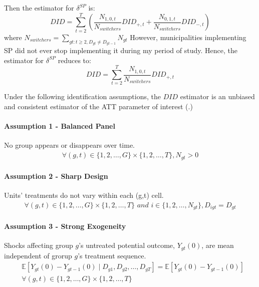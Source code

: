\documentclass[10pt, oneside]{book}
\begin{document}
Then the estimator for $\delta^{SP}$ is:
\begin{equation*}
    DID = \sum_{t = 2}^T \left(\frac{N_{1,0,t}}{N_{switchers}} DID_{+,t} + \frac{N_{0,1,t}}{N_{switchers}} DID_{-,t}\right)
\end{equation*}
where $N_{switchers} = \sum_{gt: t\geq2, D_{gt}\neq D_{gt-1}} N_{gt}$
However, municipalities implementing SP did not ever stop implementing it during my period of study. Hence, the estimator for $\delta^{SP}$ reduces to:
\begin{equation*}
    DID = \sum_{t = 2}^T  \frac{N_{1,0,t}}{N_{switchers}} DID_{+,t}
\end{equation*}

Under the following identification assumptions, the $DID$ estimator is an unbiased and consistent estimator of the ATT parameter of interest (\cite{deChaisemartin_twfe_weight}.)

\paragraph{Assumption 1 - Balanced Panel} No group appears or disappears over time. \begin{align*}
\forall (g,t) \in \{1, 2, \dots, G\} \times \{1, 2, \dots, T\}, N_{gt} > 0
\end{align*}

\paragraph{Assumption 2 - Sharp Design} Units' treatments do not vary within each (g,t) cell.
\begin{align*}
\forall (g,t) \in \{1, 2, \dots, G\} \times \{1, 2, \dots, T\} \textit{ and } i \in \{1, 2, \dots, N_{gt}\}, D_{igt} = D_{gt}
\end{align*}

\paragraph{Assumption 3 - Strong Exogeneity} Shocks affecting group $g$'s untreated potential outcome, $Y_{gt}(0)$, are mean independent of grorup $g$'s treatment sequence. 
\begin{align*}
& \mathbb{E}[Y_{gt}(0) - Y_{gt-1}(0) \mid D_{g1}, D_{g2}, \dots, D_{gT}] = \mathbb{E}[Y_{gt}(0) - Y_{gt-1}(0)] \\
& \forall (g,t) \in \{1, 2, \dots, G\} \times \{1, 2, \dots, T\}
\end{align*}
\end{document}
